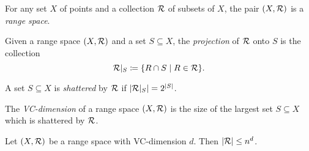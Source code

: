 \chapter{}

\begin{definition} \label{def:range-space}
    For any set $X$ of points and a collection $\mathcal{R}$ of subsets of $X$,
    the pair $(X, \mathcal{R})$ is a \emph{range space}.
\end{definition}

\begin{definition}[Projection] \label{def:projection}
    Given a range space $(X, \mathcal{R})$ and a set $S \subseteq X$, the
    \emph{projection} of $\mathcal{R}$ onto $S$ is the collection \[
        \mathcal{R}\vert_S \coloneq \{R \cap S \mid R \in \mathcal{R}\}.
    \]
\end{definition}

\begin{definition}[Shattering] \label{def:shattering}
    A set $S \subseteq X$ is \emph{shattered} by $\mathcal{R}$ if
    $\lvert\mathcal{R}\vert_S\rvert = 2^{\lvert S\rvert}$.
\end{definition}

\begin{definition}[VC-dimension] \label{def:vc-dimension}
    The \emph{VC-dimension} of a range space $(X, \mathcal{R})$ is the size of the
    largest set $S \subseteq X$ which is shattered by $\mathcal{R}$.
\end{definition}

\begin{theorem} \label{thm:sauer-shelah}
    Let $(X, \mathcal{R})$ be a range space with VC-dimension $d$.
    Then $\lvert\mathcal{R}\rvert \le n^d$.
\end{theorem}
